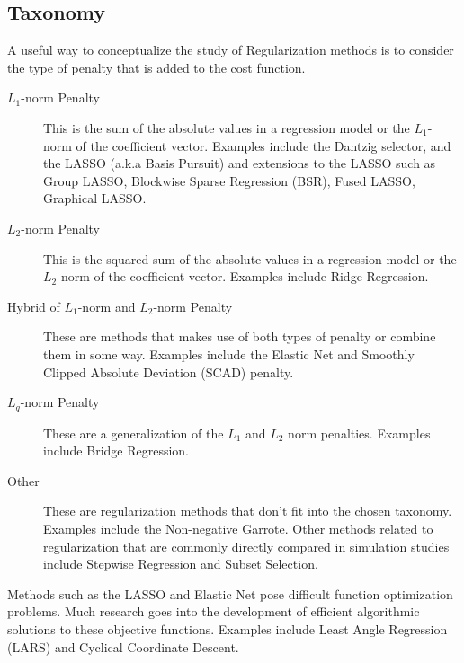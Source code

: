 \begin{bibunit}
\subsection{Taxonomy}
A useful way to conceptualize the study of Regularization methods is to consider the type of penalty that is added to the cost function.

\begin{description}
	\item[$L_1$-norm Penalty] This is the sum of the absolute values in a regression model or the $L_1$-norm of the coefficient vector. Examples include the Dantzig selector, and the LASSO (a.k.a Basis Pursuit) and extensions to the LASSO such as Group LASSO, Blockwise Sparse Regression (BSR), Fused LASSO, Graphical LASSO.
	\item[$L_2$-norm Penalty] This is the squared sum of the absolute values in a regression model or the $L_2$-norm of the coefficient vector. Examples include Ridge Regression.
	\item[Hybrid of $L_1$-norm and $L_2$-norm Penalty] These are methods that makes use of both types of penalty or combine them in some way. Examples include the Elastic Net and Smoothly Clipped Absolute Deviation (SCAD) penalty.
	\item[$L_q$-norm Penalty] These are a generalization of the $L_1$ and $L_2$ norm penalties. Examples include Bridge Regression.
	\item[Other] These are regularization methods that don't fit into the chosen taxonomy. Examples include the Non-negative Garrote. Other methods related to regularization that are commonly directly compared in simulation studies include Stepwise Regression and Subset Selection.
\end{description}

Methods such as the LASSO and Elastic Net pose difficult function optimization problems. Much research goes into the development of efficient algorithmic solutions to these objective functions. Examples include Least Angle Regression (LARS) and Cyclical Coordinate Descent.


\end{bibunit}
